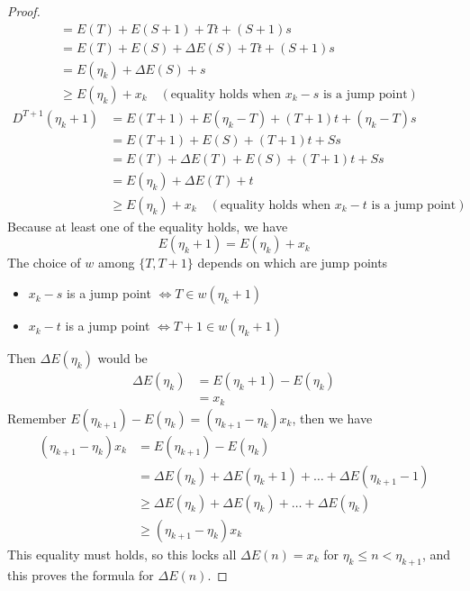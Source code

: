 \documentclass[]{article}
\begin{document}
\begin{proof}
\begin{align*}
	&= E(T) + E(S+1) +Tt +(S+1)s\\
	&= E(T) + E(S) + \Delta E(S) +Tt +(S+1)s\\
	&= E(\eta_k) + \Delta E(S) +s \\
	&\geq E(\eta_k) + x_k \quad (\text{equality holds when $x_k-s$ is a jump point})
	\end{align*}
	\begin{align*}
	D^{T+1}(\eta_k+1) &= E(T+1) + E(\eta_k-T) +(T+1)t +(\eta_k-T)s \\
	&= E(T+1) + E(S) +(T+1)t +Ss \\
	&= E(T) + \Delta E(T)+ E(S) +  (T+1)t +Ss\\
	&= E(\eta_k) + \Delta E(T) +t \\
	&\geq E(\eta_k) + x_k \quad (\text{equality holds when $x_k-t$ is a jump point})
	\end{align*}
	Because at least one of the equality holds, we have
	\[
	E(\eta_k+1) =  E(\eta_k) + x_k
	\]
	The choice of $w$ among $\{T, T+1\}$ depends on which are jump points
	\begin{itemize}
		\item $x_k-s$ is a jump point $\iff T \in w(\eta_k+1)$
		\item $x_k-t$ is a jump point $\iff T+1 \in w(\eta_k+1)$
	\end{itemize}
	Then $\Delta E(\eta_k)$ would be
	\begin{align*}
	\Delta E(\eta_k) &= E(\eta_k+1) - E(\eta_k) \\
	&= x_k
	\end{align*}
	Remember $E(\eta_{k+1}) - E(\eta_k) = (\eta_{k+1} -\eta_k)x_k$, then we have
	\begin{align*}
	(\eta_{k+1} -\eta_k)x_k &= E(\eta_{k+1}) - E(\eta_k) \\
	&= \Delta E(\eta_k) + \Delta E(\eta_k + 1) +\dots+\Delta E(\eta_{k+1} - 1) \\
	&\geq  \Delta E(\eta_k) + \Delta E(\eta_k) +\dots+\Delta E(\eta_k) \\
	&\geq (\eta_{k+1} -\eta_k)x_k
	\end{align*}
	This equality must holds, so this locks all $\Delta E(n) = x_k$ for $\eta_{k} \leq n < \eta_{k+1}$, and this proves the formula for $\Delta E(n)$.


\end{proof}
\end{document}
